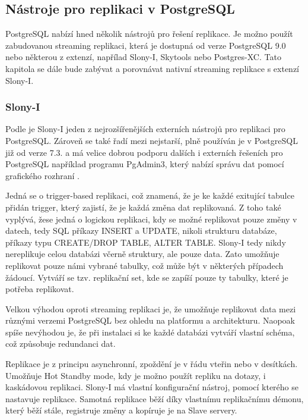 \subsection{Nástroje pro replikaci v PostgreSQL}

PostgreSQL nabízí hned několik nástrojů pro řešení replikace. Je možno použít zabudovanou streaming replikaci, která je dostupná od verze PostgreSQL 9.0 nebo některou z extenzí, napřílad Slony-I, Skytools nebo Postgres-XC. Tato kapitola se dále bude zabývat a porovnávat nativní streaming replikace s extenzí Slony-I.

\subsubsection{Slony-I}
\label{Slony}

Podle \cite{Boszormenyi2013} je Slony-I jeden z nejrozšířenějších externích nástrojů pro replikaci pro PostgreSQL. Zároveň se také řadí mezi nejstarší, plně používán je v PostgreSQL již od verze 7.3. a má velice dobrou podporu dalších i externích řešeních pro PostgreSQL například programu PgAdmin3, který nabízí správu dat pomocí grafického rozhraní \citep{Boszormenyi2013}.

Jedná se o trigger-based replikaci, což znamená, že je ke každé exitující tabulce přidán trigger, který zajistí, že je každá změna dat replikovaná. Z toho také vyplývá, žese jedná o logickou replikaci, kdy se možné replikovat pouze změny v datech, tedy SQL příkazy INSERT a UPDATE, nikoli strukturu databáze, příkazy typu CREATE/DROP TABLE, ALTER TABLE. Slony-I tedy nikdy nereplikuje celou databázi včerně struktury, ale pouze data. Zato umožňuje replikovat pouze námi vybrané tabulky, což může být v některých případech žádoucí. Vytváří se tzv. replikační set, kde se zapíší pouze ty tabulky, které je potřeba replikovat. 

Velkou výhodou oproti streaming replikaci je, že umožňuje replikovat data mezi různými verzemi PostgreSQL bez ohledu na platformu a architekturu. Naopoak spíše nevýhodou je, že při instalaci si ke každé databázi vytváří vlastní schéma, což způsobuje redundanci dat. 

Replikace je z principu asynchronní, zpoždění je v řádu vteřin nebo v desítkách. Umožňuje Hot Standby mode, kdy je možno použít repliku na dotazy, i kaskádovou replikaci. Slony-I má vlastní konfigurační nástroj, pomocí kterého se nastavuje replikace. Samotná replikace běží díky vlastnímu replikačnímu démonu, který běží stále, registruje změny a kopíruje je na Slave servery.


